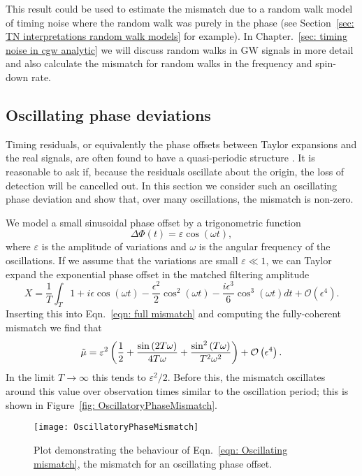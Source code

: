 \documentclass[../full_thesis/full_thesis.tex]{subfiles}
\begin{document}
This result could be used to estimate the mismatch due to a random walk model
of timing noise where the random walk was purely in the phase (see
Section~\ref{sec: TN interpretations random walk models} for example). In
Chapter.~\ref{sec: timing noise in cgw analytic} we will discuss random walks
in GW signals in more detail and also calculate the
mismatch for random walks in the frequency and spin-down rate.

\subsection{Oscillating phase deviations}

Timing residuals, or equivalently the phase offsets between Taylor expansions
and the real signals, are often found to have a quasi-periodic structure
\citep{Hobbs2010}. It is reasonable to ask if, because the residuals oscillate
about the origin, the loss of detection will be cancelled out. In this section
we consider such an oscillating phase deviation and show that, over many
oscillations, the mismatch is non-zero.

We model a small sinusoidal phase offset by a trigonometric function
\begin{equation}
\Delta \Phi(t) = \varepsilon \cos(\omega t),
\end{equation}
where $\varepsilon$ is the amplitude of variations and $\omega$ is the angular
frequency of the oscillations. If we assume that the variations are small
$\varepsilon \ll 1$, we can Taylor expand the exponential phase offset in
the matched filtering amplitude
\begin{equation}
X = \frac{1}{T}\int_{T}
1 + i \epsilon \cos{\left (\omega t \right )}
- \frac{\epsilon^{2}}{2} \cos^{2}{\left (\omega t \right )}
- \frac{i \epsilon^{3}}{6} \cos^{3}{\left (\omega t \right )}
dt
+ \mathcal{O}\left(\epsilon^{4}\right).
\end{equation}
Inserting this into Eqn.~\eqref{eqn: full mismatch} and computing the
fully-coherent mismatch we find that
\begin{equation}
\tilde{\mu} = \varepsilon^{2} \left(\frac{1}{2}
+ \frac{\sin{\left (2 T \omega \right )}}{4 T \omega}
+ \frac{\sin^{2}{\left (T \omega \right )}}{T^{2} \omega^{2}} \right)
+ \mathcal{O}\left(\epsilon^{4}\right).
\label{eqn: Oscillating mismatch}
\end{equation}
In the limit $T \rightarrow \infty$ this tends to $\varepsilon^{2}/2$. Before
this, the mismatch oscillates around this value over observation times similar
to the oscillation period; this is shown in Figure~\ref{fig:
OscillatoryPhaseMismatch}.
\begin{figure}[ht]
\centering
\texttt{[image: OscillatoryPhaseMismatch]}
\caption{Plot demonstrating the behaviour of Eqn.~\eqref{eqn: Oscillating
mismatch}, the mismatch for an oscillating phase offset.}
\label{fig: OscillatoryPhaseMismatch}
\end{figure}
\end{document}
